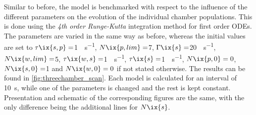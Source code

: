             Similar to before, the model is benchmarked with respect to the influence of the different parameters on the evolution of the individual chamber populations. This is done using the \textit{4th order Runge-Kutta} integration method for first order ODEs. The parameters are varied in the same way as before, whereas the initial values are set to $\tau\ix{s,p}=$\SI{1}{\arbitraryunit\per\second}, $N\ix{p,lim}=$\SI{7}{\arbitraryunit}, $\Gamma\ix{s}=$\SI{20}{\arbitraryunit\per\second}, $N\ix{w,lim}=$\SI{5}{\arbitraryunit}, $\tau\ix{w,s}=$\SI{1}{\arbitraryunit\per\second}, $\tau\ix{s}=$\SI{1}{\arbitraryunit\per\second}, $N\ix{p,0}=0$, $N\ix{s,0}=$\SI{1}{\arbitraryunit} and $N\ix{w,0}=0$ if not stated otherwise. The results can be found in \cref{fig:threechamber_scan}. Each model is calculated for an interval of \SI{10}{\second}, while one of the parameters is changed and the rest is kept constant. Presentation and schematic of the corresponding figures are the same, with the only difference being the additional lines for $N\ix{s}$.\\%
